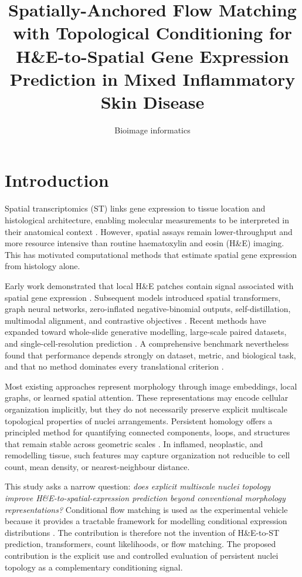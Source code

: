 \documentclass[nocrop]{bioinfo}
\subtitle{Bioimage informatics}
\title{Spatially-Anchored Flow Matching with Topological Conditioning for H\&E-to-Spatial Gene Expression Prediction in Mixed Inflammatory Skin Disease}
\author{\authorinfo}
\begin{document}
\maketitle

\section{Introduction}

Spatial transcriptomics (ST) links gene expression to tissue location and
histological architecture, enabling molecular measurements to be interpreted
in their anatomical context \citep{stahl2016visualization}. However, spatial
assays remain lower-throughput and more resource intensive than routine
haematoxylin and eosin (H\&E) imaging. This has motivated computational
methods that estimate spatial gene expression from histology alone.

Early work demonstrated that local H\&E patches contain signal associated
with spatial gene expression \citep{he2020integrating}. Subsequent models
introduced spatial transformers, graph neural networks, zero-inflated
negative-binomial outputs, self-distillation, multimodal alignment, and
contrastive objectives
\citep{zeng2022hist2st,xie2023bleep,jia2023thitogene,min2024mclstexp}.
Recent methods have expanded toward whole-slide generative modelling,
large-scale paired datasets, and single-cell-resolution prediction
\citep{huang2025stflow,jaume2024hest,chen2024stimage,fu2025ghist}.
A comprehensive benchmark nevertheless found that performance depends
strongly on dataset, metric, and biological task, and that no method dominates
every translational criterion \citep{wang2025benchmarking}.

Most existing approaches represent morphology through image embeddings,
local graphs, or learned spatial attention. These representations may encode
cellular organization implicitly, but they do not necessarily preserve
explicit multiscale topological properties of nuclei arrangements.
Persistent homology offers a principled method for quantifying connected
components, loops, and structures that remain stable across geometric scales
\citep{bubenik2015landscapes}. In inflamed, neoplastic, and remodelling
tissue, such features may capture organization not reducible to cell count,
mean density, or nearest-neighbour distance.

This study asks a narrow question: \emph{does explicit multiscale nuclei
topology improve H\&E-to-spatial-expression prediction beyond conventional
morphology representations?} Conditional flow matching is used as the
experimental vehicle because it provides a tractable framework for modelling
conditional expression distributions \citep{lipman2023flow}. The contribution
is therefore not the invention of H\&E-to-ST prediction, transformers, count
likelihoods, or flow matching. The proposed contribution is the explicit use
and controlled evaluation of persistent nuclei topology as a complementary
conditioning signal.
\end{document}
